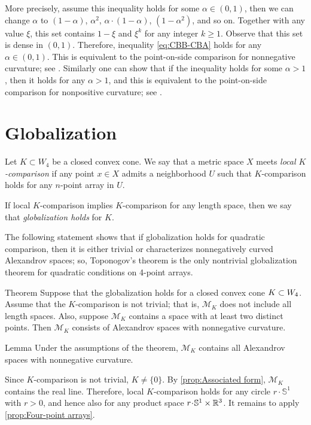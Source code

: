 \documentclass[a4paper,10pt]{article}
\begin{document}
More precisely, assume this inequality holds for some $\alpha\in (0,1)$, then we can change $\alpha$ to $(1-\alpha)$, $\alpha^2$,  $\alpha\cdot (1-\alpha)$, $(1-\alpha^2)$, and so on.
Together with any value $\xi$, this set contains $1-\xi$ and $\xi^k$ for any integer $k\ge 1$.
Observe that this set is dense in $(0,1)$.
Therefore, inequality \ref{eq:CBB-CBA} holds for any $\alpha\in (0,1)$.
This is equivalent to the point-on-side comparison for nonnegative curvature; see \cite[8.14]{AKP-2024}.
Similarly one can show that if the inequality holds for some $\alpha>1$, then it holds for any $\alpha>1$,
and this is equivalent to the point-on-side comparison for nonpositive curvature; see \cite[9.14]{AKP-2024}.
\qeds

\section{Globalization}\label{par:globalization}

Let $K\subset W_4$ be a closed convex cone.
We say that a metric space $X$ meets \emph{local $K$-comparison} if any point $x\in X$ admits a neighborhood $U$ such that $K$-comparison holds for any $n$-point array in $U$.

If local $K$-comparison implies $K$-comparison for any length space, then we say that \emph{globalization holds} for $K$.

The following statement shows that if globalization holds for quadratic comparison, then it is either trivial or characterizes nonnegatively curved Alexandrov spaces;
so, Toponogov's theorem is the only nontrivial globalization theorem for quadratic conditions on 4-point arrays.

\begin{thm}{Theorem}\label{thm:globalization}
Suppose that the globalization holds for a closed convex cone $K\z\subset W_4$.
Assume that the $K$-comparison is not trivial;
that is, $\mathcal{M}_K$ does not include all length spaces.
Also, suppose $\mathcal{M}_K$ contains a space with at least two distinct points.
Then $\mathcal{M}_K$ consists of Alexandrov spaces with nonnegative curvature.
\end{thm}

\begin{thm}{Lemma}\label{lem:globalization}
Under the assumptions of the theorem, $\mathcal{M}_K$ contains all Alexandrov spaces with nonnegative curvature.
\end{thm}

Since $K$-comparison is not trivial, $K\ne\{0\}$.
By \ref{prop:Associated form}, $\mathcal{M}_K$ contains the real line.
Therefore, local $K$-comparison holds
for any circle $r\cdot \mathbb{S}^1$ with $r>0$, and hence also for any product space $r\cdot \mathbb{S}^1\times\RR^3$.
It remains to apply \ref{prop:Four-point arrays}.
\qeds
\end{document}
